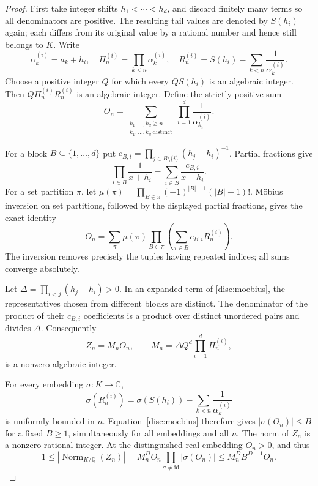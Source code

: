 \documentclass[11pt,a4paper]{article}
\theoremstyle{definition}
\theoremstyle{remark}
\numberwithin{equation}{section}
\begin{document}
\begin{proof}
First take integer shifts $h_1<\cdots<h_d$, and discard finitely
many terms so all denominators are positive. The resulting tail values
are denoted by $S(h_i)$ again; each differs from its original value by
a rational number and hence still belongs to $K$. Write
\[
 \alpha_k^{(i)}=a_k+h_i,\quad
 \Pi_n^{(i)}=\prod_{k<n}\alpha_k^{(i)},\quad
 R_n^{(i)}=S(h_i)-\sum_{k<n}\frac1{\alpha_k^{(i)}}.
\]
Choose a positive integer $Q$ for which every $QS(h_i)$ is an
algebraic integer.  Then $Q\Pi_n^{(i)}R_n^{(i)}$ is an algebraic
integer.  Define the strictly positive sum
\[
 O_n=\sum_{\substack{k_1,\ldots,k_d\ge n\\
                    k_1,\ldots,k_d\ \mathrm{distinct}}}
               \prod_{i=1}^d\frac1{\alpha_{k_i}^{(i)}}.
\]

For a block $B\subseteq\{1,\ldots,d\}$ put
$c_{B,i}=\prod_{j\in B\setminus\{i\}}(h_j-h_i)^{-1}$.
Partial fractions give
\[
 \prod_{i\in B}\frac1{x+h_i}
   =\sum_{i\in B}\frac{c_{B,i}}{x+h_i}.
\]
For a set partition $\pi$, let
$\mu(\pi)=\prod_{B\in\pi}(-1)^{|B|-1}(|B|-1)!$.
M\"obius inversion on set partitions, followed by the displayed
partial fractions, gives the exact identity
\begin{equation}\label{disc:moebius}
 O_n=\sum_{\pi}\mu(\pi)
       \prod_{B\in\pi}\left(\sum_{i\in B}c_{B,i}R_n^{(i)}\right).
\end{equation}
The inversion removes precisely the tuples having repeated indices;
all sums converge absolutely.

Let $\Delta=\prod_{i<j}(h_j-h_i)>0$.  In an expanded term of
\eqref{disc:moebius}, the representatives chosen from different blocks
are distinct.  The denominator of the product of their $c_{B,i}$
coefficients is a product over distinct unordered pairs and divides
$\Delta$.  Consequently
\[
 Z_n=M_nO_n,\qquad
 M_n=\Delta Q^d\prod_{i=1}^d\Pi_n^{(i)},
\]
is a nonzero algebraic integer.

For every embedding $\sigma:K\longrightarrow\mathbb C$,
\[
 \sigma(R_n^{(i)})=
 \sigma(S(h_i))-\sum_{k<n}\frac1{\alpha_k^{(i)}}
\]
is uniformly bounded in $n$.  Equation~\eqref{disc:moebius} therefore
gives $|\sigma(O_n)|\le B$ for a fixed $B\ge1$, simultaneously
for all embeddings and all $n$.  The norm of $Z_n$ is a nonzero
rational integer.  At the distinguished real embedding $O_n>0$,
and thus
\[
 1\le\left|\operatorname{Norm}_{K/\mathbb Q}(Z_n)\right|
   =M_n^DO_n\prod_{\sigma\ne\mathrm{id}}|\sigma(O_n)|
   \le M_n^DB^{D-1}O_n.
\]


\end{proof}
\end{document}
